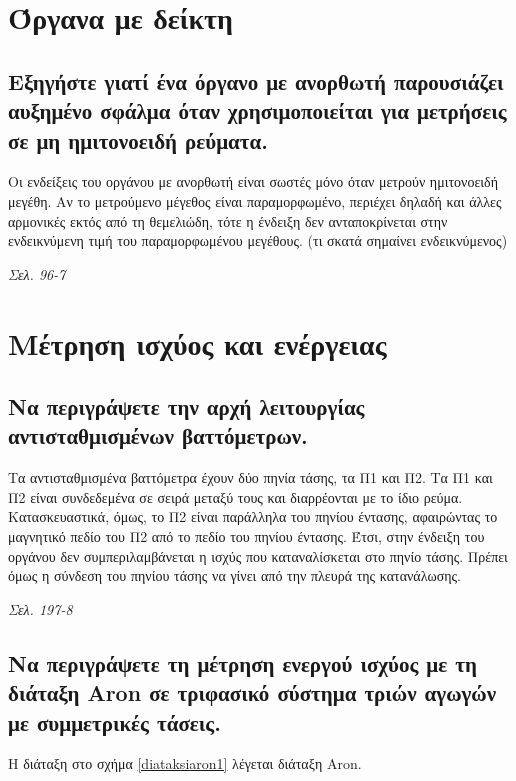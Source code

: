 \documentclass{article}
\begin{document}
\section{Όργανα με δείκτη}
\subsection{Εξηγήστε γιατί ένα όργανο με ανορθωτή παρουσιάζει αυξημένο σφάλμα όταν χρησιμοποιείται για μετρήσεις σε μη ημιτονοειδή ρεύματα.}
Οι ενδείξεις του οργάνου με ανορθωτή είναι σωστές μόνο όταν μετρούν ημιτονοειδή μεγέθη. Αν το μετρούμενο μέγεθος είναι παραμορφωμένο, περιέχει δηλαδή και άλλες αρμονικές
εκτός από τη θεμελιώδη, τότε η ένδειξη δεν ανταποκρίνεται στην ενδεικνύμενη τιμή του παραμορφωμένου μεγέθους. (τι σκατά σημαίνει ενδεικνύμενος)

\emph{Σελ. 96-7}

\section{Μέτρηση ισχύος και ενέργειας}
\subsection{Να περιγράψετε την αρχή λειτουργίας αντισταθμισμένων βαττόμετρων.}
Τα αντισταθμισμένα βαττόμετρα έχουν δύο πηνία τάσης, τα Π1 και Π2. Τα Π1 και Π2 είναι συνδεδεμένα σε σειρά μεταξύ τους και διαρρέονται με το ίδιο ρεύμα. Κατασκευαστικά, 
όμως, το Π2 είναι παράλληλα του πηνίου έντασης, αφαιρώντας το μαγνητικό πεδίο του Π2 από το πεδίο του πηνίου έντασης. Έτσι, στην ένδειξη του οργάνου δεν 
συμπεριλαμβάνεται η ισχύς που καταναλίσκεται στο πηνίο τάσης. Πρέπει όμως η σύνδεση του πηνίου τάσης να γίνει από την πλευρά της κατανάλωσης.

\emph{Σελ. 197-8}

\subsection{Να περιγράψετε τη μέτρηση ενεργού ισχύος με τη διάταξη \foreignlanguage{english}{Aron} σε τριφασικό σύστημα τριών αγωγών με συμμετρικές τάσεις.}
Η διάταξη στο σχήμα \ref{diataksiaron1} λέγεται διάταξη \foreignlanguage{english}{Aron}.
\end{document}
